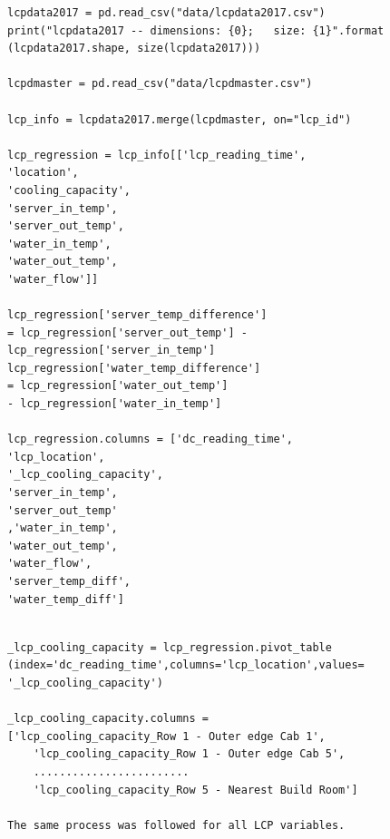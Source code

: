 \documentclass[12pt]{scrartcl}
\begin{document}
\begin{lstlisting}[frame=single,basicstyle=\footnotesize\ttfamily,
  caption={Python - Import and Merge LCP Data},label={list:[Import and Merge LCP Data]}]
lcpdata2017 = pd.read_csv("data/lcpdata2017.csv")
print("lcpdata2017 -- dimensions: {0};   size: {1}".format
(lcpdata2017.shape, size(lcpdata2017)))

lcpdmaster = pd.read_csv("data/lcpdmaster.csv")

lcp_info = lcpdata2017.merge(lcpdmaster, on="lcp_id")

lcp_regression = lcp_info[['lcp_reading_time',
'location',
'cooling_capacity',
'server_in_temp',
'server_out_temp',
'water_in_temp',
'water_out_temp',
'water_flow']]

lcp_regression['server_temp_difference'] 
= lcp_regression['server_out_temp'] - 
lcp_regression['server_in_temp']
lcp_regression['water_temp_difference'] 
= lcp_regression['water_out_temp'] 
- lcp_regression['water_in_temp']

lcp_regression.columns = ['dc_reading_time',
'lcp_location',
'_lcp_cooling_capacity',
'server_in_temp',
'server_out_temp'
,'water_in_temp',
'water_out_temp',
'water_flow',
'server_temp_diff',
'water_temp_diff']


\end{lstlisting}

\begin{lstlisting}[frame=single,basicstyle=\footnotesize\ttfamily,
  caption={Python - Pivot Data around the LCP reading time},label={list:[Pivot Data around the LCP reading time]}]
_lcp_cooling_capacity = lcp_regression.pivot_table
(index='dc_reading_time',columns='lcp_location',values=
'_lcp_cooling_capacity')

_lcp_cooling_capacity.columns = 
['lcp_cooling_capacity_Row 1 - Outer edge Cab 1',
    'lcp_cooling_capacity_Row 1 - Outer edge Cab 5', 
    ........................
    'lcp_cooling_capacity_Row 5 - Nearest Build Room']
    
The same process was followed for all LCP variables.

\end{lstlisting}
\end{document}
